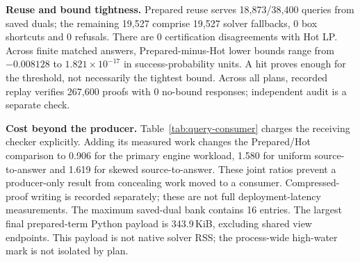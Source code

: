 \textbf{Reuse and bound tightness.} Prepared reuse serves 18,873/38,400 queries from saved duals; the remaining 19,527 comprise 19,527 solver fallbacks, 0 box shortcuts and 0 refusals. There are 0 certification disagreements with Hot LP. Across finite matched answers, Prepared-minus-Hot lower bounds range from $-0.008128$ to $1.821\times10^{-17}$ in success-probability units. A hit proves enough for the threshold, not necessarily the tightest bound. Across all plans, recorded replay verifies 267,600 proofs with 0 no-bound responses; independent audit is a separate check.

\begin{table}[t]
\centering
\caption{Measured producer and consumer costs in seconds. Each entry is a three-repeat median. Joint costs add producer time, fresh checker initialization, JSON decoding and proof verification within each repeat before taking the median; Joint/Hot is the median paired joint-cost ratio. Thus the displayed component medians need not sum exactly to the joint median. Compression, compressed-file reading/decompression and unmeasured network transfer are excluded from the joint total.}
\label{tab:query-consumer}
\end{table}

\textbf{Cost beyond the producer.} Table~\ref{tab:query-consumer} charges the receiving checker explicitly. Adding its measured work changes the Prepared/Hot comparison to 0.906 for the primary engine workload, 1.580 for uniform source-to-answer and 1.619 for skewed source-to-answer. These joint ratios prevent a producer-only result from concealing work moved to a consumer. Compressed-proof writing is recorded separately; these are not full deployment-latency measurements. The maximum saved-dual bank contains 16 entries. The largest final prepared-term Python payload is 343.9\,KiB, excluding shared view endpoints. This payload is not native solver RSS; the process-wide high-water mark is not isolated by plan.
